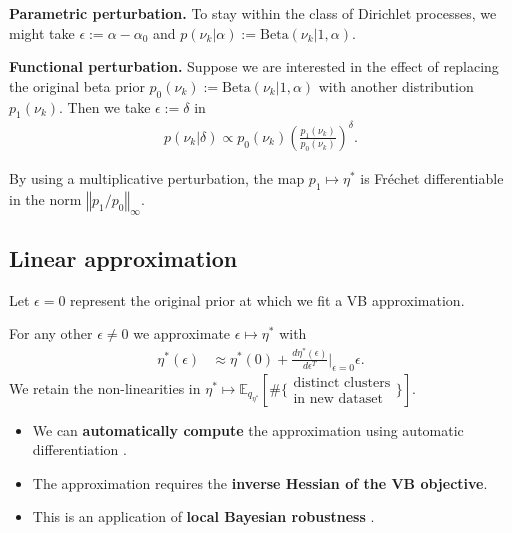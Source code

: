 \documentclass[a0,plainsections,30pt]{sciposter}\usepackage[]{graphicx}\usepackage[]{color}
\newcommand{\Expect}{\mathbb{E}}
\newcommand{\etaopt}{\eta^{*}}
\newcommand{\targetexpectation}{\Expect_{q_{\eta^*}}
\left[\#\{\substack{\text{distinct clusters}\\\text{in new dataset}}\} \right]}
\begin{document}
\begin{minipage}[t]{0.45\textwidth}

\textbf{Parametric perturbation.} To stay within the class of Dirichlet
processes, we might take $\epsilon := \alpha - \alpha_0$ and $p(\nu_k | \alpha) :=
\mathrm{Beta}(\nu_k | 1, \alpha)$.

\textbf{Functional perturbation.} Suppose we are interested in the effect of
replacing the original beta prior $p_0(\nu_k) := \mathrm{Beta}(\nu_k | 1,
\alpha)$ with another distribution $p_1(\nu_k)$. Then we take $\epsilon :=
\delta$ in
%
\vspace{-0.3in}
\begin{align*}
p(\nu_k \vert \delta) \propto
    p_{0}(\nu_k)\left(\frac{p_1(\nu_k)}{p_0(\nu_k)}\right)^\delta.
\end{align*}
\vspace{-0.3in}

By using a multiplicative perturbation, the map $p_1 \mapsto \etaopt$ is
Fr\'{e}chet differentiable in the norm $\left\Vert p_1 / p_0
\right\Vert_\infty$.

\vspace{-0.3in}
\subsection*{Linear approximation}
\vspace{-0.2in}
Let $\epsilon=0$ represent the original prior at which we fit a VB
approximation.

\begin{mdframed}[style=MyFrame]
For any other $\epsilon \ne 0$ we approximate $\epsilon \mapsto \etaopt$ with
\begin{align*}
\eta^*(\epsilon)  &\approx  \eta^*(0) +
\frac{d \eta^*(\epsilon)}{d\epsilon^T}\Big|_{\epsilon=0} \epsilon.
\label{eq:linear_approx}
\end{align*}
We retain the non-linearities in $\etaopt \mapsto \targetexpectation$.
\end{mdframed}

\begin{itemize}
\item We can \textbf{automatically compute}
    the approximation
    using automatic differentiation \cite{giordano:2017:covariances}.
\item The approximation requires the
    \textbf{inverse Hessian of the VB objective}.
\item This is an application of \textbf{local Bayesian robustness}
\citep{gustafson:1996:localposterior}.
\end{itemize}


\end{minipage}
\end{document}
